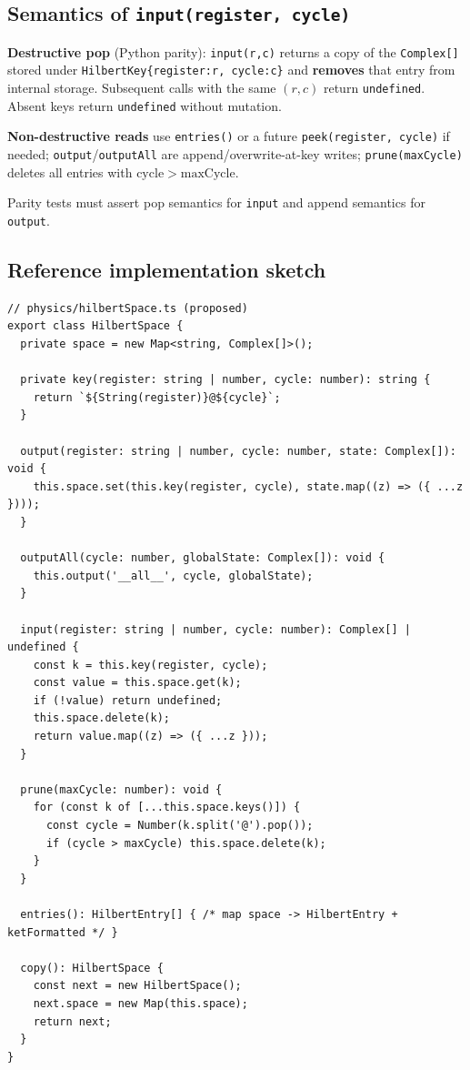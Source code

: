 \documentclass[11pt,a4paper]{article}
\begin{document}
\subsection{Semantics of \texttt{input(register, cycle)}}

\textbf{Destructive pop} (Python parity): \texttt{input(r,c)} returns a copy of the \texttt{Complex[]} stored under \texttt{HilbertKey\{register:r, cycle:c\}} and \textbf{removes} that entry from internal storage. Subsequent calls with the same $(r,c)$ return \texttt{undefined}. Absent keys return \texttt{undefined} without mutation.

\textbf{Non-destructive reads} use \texttt{entries()} or a future \texttt{peek(register, cycle)} if needed; \texttt{output}/\texttt{outputAll} are append/overwrite-at-key writes; \texttt{prune(maxCycle)} deletes all entries with $\mathrm{cycle}>\mathrm{maxCycle}$.

Parity tests must assert pop semantics for \texttt{input} and append semantics for \texttt{output}.

\subsection{Reference implementation sketch}

\begin{lstlisting}[style=code]
// physics/hilbertSpace.ts (proposed)
export class HilbertSpace {
  private space = new Map<string, Complex[]>();

  private key(register: string | number, cycle: number): string {
    return `${String(register)}@${cycle}`;
  }

  output(register: string | number, cycle: number, state: Complex[]): void {
    this.space.set(this.key(register, cycle), state.map((z) => ({ ...z })));
  }

  outputAll(cycle: number, globalState: Complex[]): void {
    this.output('__all__', cycle, globalState);
  }

  input(register: string | number, cycle: number): Complex[] | undefined {
    const k = this.key(register, cycle);
    const value = this.space.get(k);
    if (!value) return undefined;
    this.space.delete(k);
    return value.map((z) => ({ ...z }));
  }

  prune(maxCycle: number): void {
    for (const k of [...this.space.keys()]) {
      const cycle = Number(k.split('@').pop());
      if (cycle > maxCycle) this.space.delete(k);
    }
  }

  entries(): HilbertEntry[] { /* map space -> HilbertEntry + ketFormatted */ }

  copy(): HilbertSpace {
    const next = new HilbertSpace();
    next.space = new Map(this.space);
    return next;
  }
}
\end{lstlisting}
\end{document}

